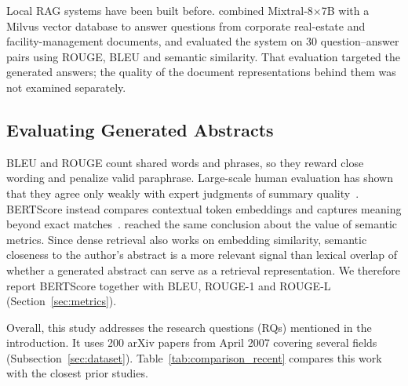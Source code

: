 \documentclass[bdcc,article,submit,pdftex,moreauthors]{Definitions/mdpi}
\begin{document}
Local RAG systems have been built before. \citet{krutli2025augmenting} combined Mixtral-8$\times$7B with a Milvus vector database to answer questions from corporate real-estate and facility-management documents, and evaluated the system on 30 question--answer pairs using ROUGE, BLEU and semantic similarity. That evaluation targeted the generated answers; the quality of the document representations behind them was not examined separately.

\subsection{Evaluating Generated Abstracts}

BLEU and ROUGE count shared words and phrases, so they reward close wording and penalize valid paraphrase. Large-scale human evaluation has shown that they agree only weakly with expert judgments of summary quality~\citep{fabbri2021summeval}. BERTScore instead compares contextual token embeddings and captures meaning beyond exact matches~\citep{zhang2019bertscore}. \citet{bektacs2025academic} reached the same conclusion about the value of semantic metrics. Since dense retrieval also works on embedding similarity, semantic closeness to the author's abstract is a more relevant signal than lexical overlap of whether a generated abstract can serve as a retrieval representation. We therefore report BERTScore together with BLEU, ROUGE-1 and ROUGE-L (Section~\ref{sec:metrics}).

Overall, this study addresses the research questions (RQs) mentioned in the introduction. It uses 200 arXiv papers from April 2007 covering several fields (Subsection~\ref{sec:dataset}). 
Table~\ref{tab:comparison_recent} compares this work with the closest prior studies.
\end{document}
